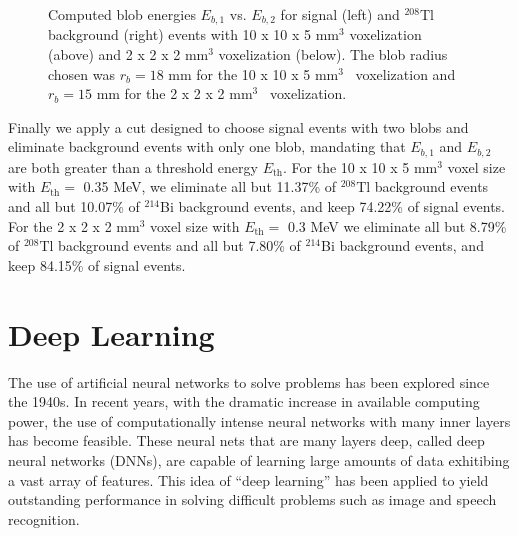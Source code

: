 \documentclass[a4paper,11pt]{article}
\begin{document}
\begin{figure}[!htb]
	\caption{Computed blob energies $E_{b,1}$ vs. $E_{b,2}$ for signal (left) and $^{208}$Tl background (right) events with 10 x 10 x 5 mm$^3$ voxelization (above) and 2 x 2 x 2 mm$^3$ voxelization (below).  The blob radius chosen was $r_b = 18$ mm for the 10 x 10 x 5 mm$^3$~ voxelization and $r_b = 15$ mm for the 2 x 2 x 2 mm$^3$~ voxelization.} \label{fig.blobcuts}
\end{figure}

Finally we apply a cut designed to choose signal events with two blobs and eliminate background events with only one blob, mandating that $E_{b,1}$ and $E_{b,2}$ are both greater than a threshold energy $E_{\mathrm{th}}$.  For the 10 x 10 x 5 mm$^3$ voxel size with $E_{\mathrm{th}} =$ 0.35 MeV, we eliminate all but 11.37\% of $^{208}$Tl background events and all but 10.07\% of $^{214}$Bi background events, and keep 74.22\% of signal events.  For the 2 x 2 x 2 mm$^3$ voxel size with $E_{\mathrm{th}} =$ 0.3 MeV we eliminate all but 8.79\% of $^{208}$Tl background events and all but 7.80\% of $^{214}$Bi background events, and keep 84.15\% of signal events. %

\section{Deep Learning}
The use of artificial neural networks to solve problems has been explored since the 1940s.  In recent years, with the dramatic increase in available computing power, the use of computationally
intense neural networks with many inner layers has become feasible.  These neural nets that are many layers deep, called deep neural networks (DNNs), are capable of learning large
amounts of data exhitibing a vast array of features.  This idea of ``deep learning'' has been applied to yield outstanding performance in solving difficult problems such as image and 
speech recognition.
\end{document}
